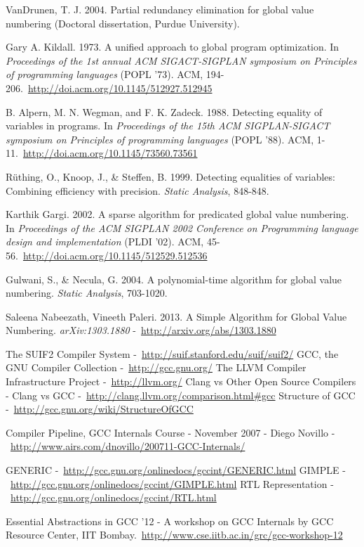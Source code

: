 \cleardoublepage
{}
{}
\begin{thebibliography}{99}

VanDrunen, T. J. 2004. Partial redundancy elimination for global value numbering (Doctoral dissertation, Purdue University).

Gary A. Kildall. 1973. A unified approach to global program optimization. In \emph{Proceedings of the 1st annual ACM SIGACT-SIGPLAN symposium on Principles of programming languages} (POPL '73). ACM, 194-206.\ \url{http://doi.acm.org/10.1145/512927.512945}

B. Alpern, M. N. Wegman, and F. K. Zadeck. 1988. Detecting equality of variables in programs. In \emph{Proceedings of the 15th ACM SIGPLAN-SIGACT symposium on Principles of programming languages} (POPL '88). ACM, 1-11.\ \url{http://doi.acm.org/10.1145/73560.73561}

R\"uthing, O., Knoop, J., \& Steffen, B. 1999. Detecting equalities of variables: Combining efficiency with precision. \emph{Static Analysis}, 848-848.

Karthik Gargi. 2002. A sparse algorithm for predicated global value numbering. In \emph{Proceedings of the ACM SIGPLAN 2002 Conference on Programming language design and implementation} (PLDI '02). ACM, 45-56.\ \url{http://doi.acm.org/10.1145/512529.512536}

Gulwani, S., \& Necula, G. 2004. A polynomial-time algorithm for global value numbering. \emph{Static Analysis}, 703-1020.

Saleena Nabeezath, Vineeth Paleri. 2013. A Simple Algorithm for Global Value Numbering. \emph{arXiv:1303.1880} -\ \url{http://arxiv.org/abs/1303.1880}

The SUIF2 Compiler System -\ \url{http://suif.stanford.edu/suif/suif2/}
GCC, the GNU Compiler Collection -\ \url{http://gcc.gnu.org/}
The LLVM Compiler Infrastructure Project -\ \url{http://llvm.org/}
Clang vs Other Open Source Compilers - Clang vs GCC -\ \url{http://clang.llvm.org/comparison.html#gcc}
Structure of GCC -\ \url{http://gcc.gnu.org/wiki/StructureOfGCC}

Compiler Pipeline, GCC Internals Course - November 2007 - Diego Novillo -\ \url{http://www.airs.com/dnovillo/200711-GCC-Internals/}

GENERIC -\ \url{http://gcc.gnu.org/onlinedocs/gccint/GENERIC.html}
GIMPLE -\ \url{http://gcc.gnu.org/onlinedocs/gccint/GIMPLE.html}
RTL Representation -\ \url{http://gcc.gnu.org/onlinedocs/gccint/RTL.html}

Essential Abstractions in GCC '12 - A workshop on GCC Internals by GCC Resource Center, IIT Bombay.\ \url{http://www.cse.iitb.ac.in/grc/gcc-workshop-12}

\end{thebibliography}
